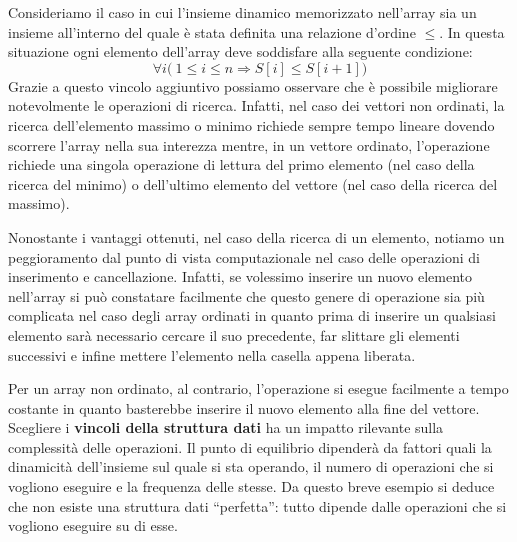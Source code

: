 Consideriamo il caso in cui l'insieme dinamico memorizzato nell'array sia un insieme all'interno del quale è stata definita una relazione d'ordine $\leq$. In questa situazione ogni elemento dell'array deve soddisfare alla seguente condizione:
\begin{displaymath}
	\forall i \bigl(\ 1 \leq i \leq n \Rightarrow S[i]\leq S[i+1]\bigr)
\end{displaymath}
Grazie a questo vincolo aggiuntivo possiamo osservare che è possibile migliorare notevolmente le operazioni di ricerca. Infatti, nel caso dei vettori non ordinati, la ricerca dell'elemento massimo o minimo richiede sempre tempo lineare dovendo scorrere l'array nella sua interezza mentre, in un vettore ordinato, l'operazione richiede una singola operazione di lettura del primo elemento (nel caso della ricerca del minimo) o dell'ultimo elemento del vettore (nel caso della ricerca del massimo).

Nonostante i vantaggi ottenuti, nel caso della ricerca di un elemento, notiamo un peggioramento dal punto di vista computazionale nel caso delle operazioni di inserimento e cancellazione. Infatti, se volessimo inserire un nuovo elemento nell'array si può constatare facilmente che questo genere di operazione sia più complicata nel caso degli array ordinati in quanto prima di inserire un qualsiasi elemento sarà necessario cercare il suo precedente, far slittare gli elementi successivi e infine mettere l'elemento nella casella appena liberata.

Per un array non ordinato, al contrario, l'operazione si esegue facilmente a tempo costante in quanto basterebbe inserire il nuovo elemento alla fine del vettore. Scegliere i \textbf{vincoli della struttura dati} ha un impatto rilevante sulla complessità delle operazioni. Il punto di equilibrio dipenderà da fattori quali la dinamicità dell'insieme sul quale si sta operando, il numero di operazioni che si vogliono eseguire e la frequenza delle stesse. Da questo breve esempio si deduce che non esiste una struttura dati ``perfetta'': tutto dipende dalle operazioni che si vogliono eseguire su di esse.


